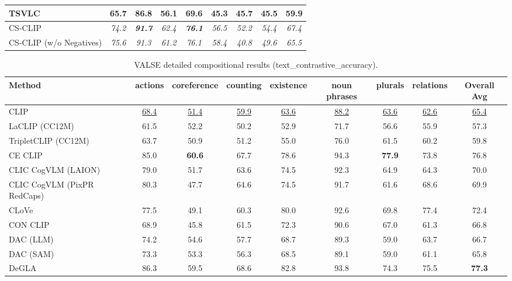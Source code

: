 \begin{table}[t]
\begin{adjustbox}{max width=\textwidth}
\begin{tabular}{p{5cm}cccc|ccc|c}
    TSVLC & 65.7 & 86.8 & 56.1 & 69.6 & 45.3 & 45.7 & 45.5 & 59.9 \\
    \midrule
    CS-CLIP & \emph{74.2} & \emph{\textbf{91.7}} & \emph{62.4} & \emph{\textbf{76.1}} & \emph{56.5} & \emph{52.2} & \emph{54.4} & \emph{67.4} \\
    CS-CLIP (w/o Negatives) & \emph{75.6} & \emph{91.3} & \emph{61.2} & \emph{76.1} & \emph{58.4} & \emph{40.8} & \emph{49.6} & \emph{65.5} \\
    \bottomrule
  \end{tabular}
  \end{adjustbox}
\end{table}

\begin{table}[t]
  \centering
  \scriptsize
  \caption{VALSE detailed compositional results (text_contrastive_accuracy).}
  \label{tab:VALSE_detailed}
  \begin{adjustbox}{max width=\textwidth}
  \setlength{\tabcolsep}{2pt}
  \begin{tabular}{p{5cm}c|c|c|c|c|c|c|c}
    \toprule
    Method & actions & coreference & counting & existence & noun phrases & plurals & relations & Overall Avg \\
    \midrule
    CLIP & \underline{68.4} & \underline{51.4} & \underline{59.9} & \underline{63.6} & \underline{88.2} & \underline{63.6} & \underline{62.6} & \underline{65.4} \\
    \midrule
    LaCLIP (CC12M) & 61.5 & 52.2 & 50.2 & 52.9 & 71.7 & 56.6 & 55.9 & 57.3 \\
    TripletCLIP (CC12M) & 63.7 & 50.9 & 51.2 & 55.0 & 76.0 & 61.5 & 60.2 & 59.8 \\
    \midrule
    CE CLIP & 85.0 & \textbf{60.6} & 67.7 & 78.6 & 94.3 & \textbf{77.9} & 73.8 & 76.8 \\
    CLIC CogVLM (LAION) & 79.0 & 51.7 & 63.6 & 74.5 & 92.3 & 64.9 & 64.3 & 70.0 \\
    CLIC CogVLM (PixPR RedCaps) & 80.3 & 47.7 & 64.6 & 74.5 & 91.7 & 61.6 & 68.6 & 69.9 \\
    CLoVe & 77.5 & 49.1 & 60.3 & 80.0 & 92.6 & 69.8 & 77.4 & 72.4 \\
    CON CLIP & 68.9 & 45.8 & 61.5 & 72.3 & 90.6 & 67.0 & 61.3 & 66.8 \\
    DAC (LLM) & 74.2 & 54.6 & 57.7 & 68.7 & 89.3 & 59.0 & 63.7 & 66.7 \\
    DAC (SAM) & 73.3 & 53.3 & 56.3 & 68.5 & 89.1 & 59.0 & 61.1 & 65.8 \\
    DeGLA & 86.3 & 59.5 & 68.6 & 82.8 & 93.8 & 74.3 & 75.5 & \textbf{77.3} \\

\end{tabular}
\end{adjustbox}
\end{table}
